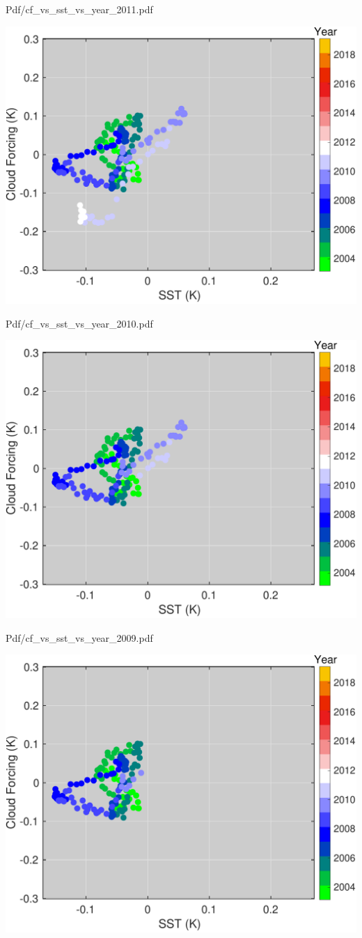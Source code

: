 \documentclass[presentation]{beamer}
\begin{document}
\begin{frame}[label={sec:org23bf21d}]{Pdf/cf\_vs\_sst\_vs\_year\_2011.pdf}
\begin{center}
\includegraphics[width=0.7\linewidth]{./Figs/Pdf/cf_vs_sst_vs_year_2011.pdf}
\end{center}
\end{frame}

\begin{frame}[label={sec:orgb363ce0}]{Pdf/cf\_vs\_sst\_vs\_year\_2010.pdf}
\begin{center}
\includegraphics[width=0.7\linewidth]{./Figs/Pdf/cf_vs_sst_vs_year_2010.pdf}
\end{center}
\end{frame}

\begin{frame}[label={sec:org4f03989}]{Pdf/cf\_vs\_sst\_vs\_year\_2009.pdf}
\begin{center}
\includegraphics[width=0.7\linewidth]{./Figs/Pdf/cf_vs_sst_vs_year_2009.pdf}
\end{center}
\end{frame}
\end{document}
